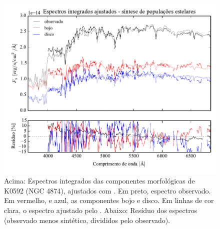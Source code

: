 \begin{figure}
	\includegraphics[page=5,width=\textwidth]{figuras/sample006a_synthesis}
	\caption[Espectros ajustados com \starlight das componentes morfológicas de
	K0592 (NGC 4874)]
	{Acima: Espectros integrados das componentes morfológicas de
	K0592 (NGC 4874), ajustados com \starlight. Em preto, espectro observado. Em
	vermelho, e azul, as componentes bojo e disco. Em linhas de cor clara, o
	espectro ajustado pelo \starlight. Abaixo: Resíduo dos espectros (observado
	menos sintético, divididos pelo observado).}
	\label{fig:decompSintese:K0592}
\end{figure}

